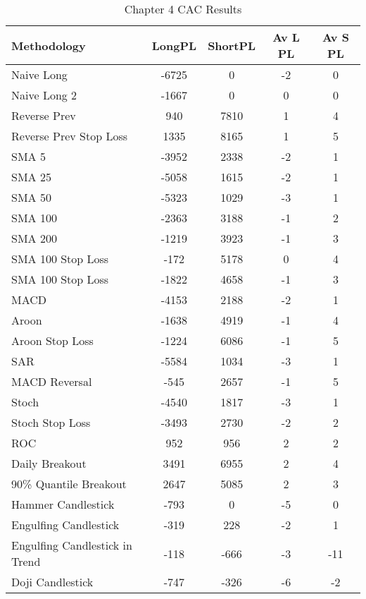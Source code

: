 \begin{table}[ht]
\centering
\caption[Chapter 4 CAC Results]{Chapter 4 CAC Results} 
\label{tab:chp6:cac_summary}
\begin{tabular}{lcccc}
  \toprule Methodology & LongPL & ShortPL & Av L PL & Av S PL \\ 
  \midrule Naive Long & -6725 & 0 & -2 & 0 \\ 
  Naive Long 2 & -1667 & 0 & 0 & 0 \\ 
  Reverse Prev & 940 & 7810 & 1 & 4 \\ 
  Reverse Prev Stop Loss & 1335 & 8165 & 1 & 5 \\ 
  SMA 5 & -3952 & 2338 & -2 & 1 \\ 
  SMA 25 & -5058 & 1615 & -2 & 1 \\ 
  SMA 50 & -5323 & 1029 & -3 & 1 \\ 
  SMA 100 & -2363 & 3188 & -1 & 2 \\ 
  SMA 200 & -1219 & 3923 & -1 & 3 \\ 
  SMA 100 Stop Loss & -172 & 5178 & 0 & 4 \\ 
  SMA 100 Stop Loss & -1822 & 4658 & -1 & 3 \\ 
  MACD & -4153 & 2188 & -2 & 1 \\ 
  Aroon & -1638 & 4919 & -1 & 4 \\ 
  Aroon Stop Loss & -1224 & 6086 & -1 & 5 \\ 
  SAR & -5584 & 1034 & -3 & 1 \\ 
  MACD Reversal & -545 & 2657 & -1 & 5 \\ 
  Stoch & -4540 & 1817 & -3 & 1 \\ 
  Stoch Stop Loss & -3493 & 2730 & -2 & 2 \\ 
  ROC & 952 & 956 & 2 & 2 \\ 
  Daily Breakout & 3491 & 6955 & 2 & 4 \\ 
  90\% Quantile Breakout & 2647 & 5085 & 2 & 3 \\ 
  Hammer Candlestick & -793 & 0 & -5 & 0 \\ 
  Engulfing Candlestick & -319 & 228 & -2 & 1 \\ 
  Engulfing Candlestick in Trend & -118 & -666 & -3 & -11 \\ 
  Doji Candlestick & -747 & -326 & -6 & -2 \\ 
   \bottomrule \end{tabular}
\end{table}
